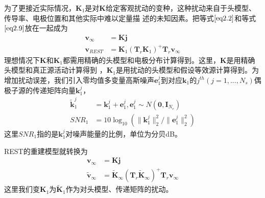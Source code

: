 为了更接近实际情况，$\mathbf{K}_1$是对$\mathbf{K}$给定客观扰动的变种，这种扰动来自于头模型、传导率、电极位置和其他实际中难以定量描
述的未知因素。把等式$\eqref{eq2.2}$和等式$\eqref{eq2.9}$放在一起成为
\begin{equation*}
\begin{split}
\mathbf{v}_{\infty}& =\mathbf{Kj}\\
\mathbf{v}_{REST}&
=\mathbf{K}_1(\mathbf{T}_r\mathbf{K}_1)^{+}\mathbf{T}_{r}\mathbf{v}_{\infty}
\end{split}
\end{equation*}
理想情况下$\mathbf{K}$和$\mathbf{K}_1$都需用精确的头模型和电极分布计算得到。这里，$\mathbf{K}$是用精确头模型和真正源活动计算得到
，$\mathbf{K}_1$是用扰动的头模型和假设等效源计算得到。为增加扰动误差，我们引入零均值多变量高斯噪声$\mathbf{e}_1^j$到对应$\mathbf{k}_1$的$j^{th}(j=1,...,N_s)$偶极子源的传递矩阵向量$\mathbf{k}_1^j$，
\begin{equation*}
\begin{split}
\tilde{\mathbf{k}}_1^j& =\mathbf{k}_1^j+\mathbf{e}_1^j,\mathbf{e}_1^j\sim{N(\mathbf{0},\mathbf{I}_{N_e})}\\
SNR_1& =10\log_{10}(\lVert\mathbf{k}_1^{j}\rVert_2^2/{\lVert\mathbf{e}_1^{j}\rVert_2^2})
\end{split}
\end{equation*}
这里$SNR_1$指的是$\mathbf{k}_1^j$对噪声能量的比例，单位为分贝dB。

REST的重建模型就转换为
\begin{equation}\label{eq2.10}
\begin{aligned}
\mathbf{v}_{\infty}& =\mathbf{Kj}\\
\tilde{\mathbf{v}}_{\infty}& =\tilde{\mathbf{K}}_{\infty}(\mathbf{T}_{r}\tilde{\mathbf{K}}_{\infty})^{+}\mathbf{T}_{r}\mathbf{v}_{\infty}
\end{aligned}
\end{equation}
这里我们变$\mathbf{K}_1$为$\tilde{\mathbf{K}}_1$作为对头模型、传递矩阵的扰动。

